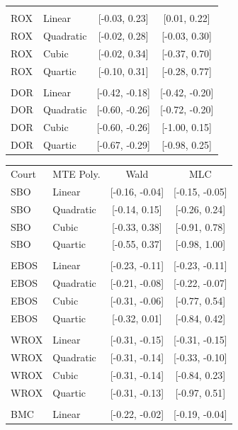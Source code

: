 \documentclass[11pt]{article}
\theoremstyle{definition}
\newcommand{\0}{\ensuremath{\mathbf{0}}}
\begin{document}
\begin{bibunit}
\begin{table}[htbp]
\begin{tabular}{llcc}
          &       &       &  \\
    ROX   & Linear & [-0.03, 0.23] & [0.01, 0.22] \\
    ROX   & Quadratic & [-0.02, 0.28] & [-0.03, 0.30] \\
    ROX   & Cubic & [-0.02, 0.34] & [-0.37, 0.70] \\
    ROX   & Quartic & [-0.10, 0.31] & [-0.28, 0.77] \\
          &       &       &  \\
    DOR   & Linear & [-0.42, -0.18] & [-0.42, -0.20] \\
    DOR   & Quadratic & [-0.60, -0.26] & [-0.72, -0.20] \\
    DOR   & Cubic & [-0.60, -0.26] & [-1.00, 0.15] \\
    DOR   & Quartic & [-0.67, -0.29] & [-0.98, 0.25] \\
    \bottomrule
    \end{tabular}%
		\quad
    \begin{tabular}{llcc}
    \toprule
    Court & MTE Poly. & Wald  & MLC \\
    SBO   & Linear & [-0.16, -0.04] & [-0.15, -0.05] \\
    SBO   & Quadratic & [-0.14, 0.15] & [-0.26, 0.24] \\
    SBO   & Cubic & [-0.33, 0.38] & [-0.91, 0.78] \\
    SBO   & Quartic & [-0.55, 0.37] & [-0.98, 1.00] \\
          &       &       &  \\
    EBOS  & Linear & [-0.23, -0.11] & [-0.23, -0.11] \\
    EBOS  & Quadratic & [-0.21, -0.08] & [-0.22, -0.07] \\
    EBOS  & Cubic & [-0.31, -0.06] & [-0.77, 0.54] \\
    EBOS  & Quartic & [-0.32, 0.01] & [-0.84, 0.42] \\
          &       &       &  \\
    WROX  & Linear & [-0.31, -0.15] & [-0.31, -0.15] \\
    WROX  & Quadratic & [-0.31, -0.14] & [-0.33, -0.10] \\
    WROX  & Cubic & [-0.31, -0.14] & [-0.84, 0.23] \\
    WROX  & Quartic & [-0.31, -0.13] & [-0.97, 0.51] \\
          &       &       &  \\
    BMC   & Linear & [-0.22, -0.02] & [-0.19, -0.04] \\

\end{tabular}
\end{table}
\end{bibunit}
\end{document}
